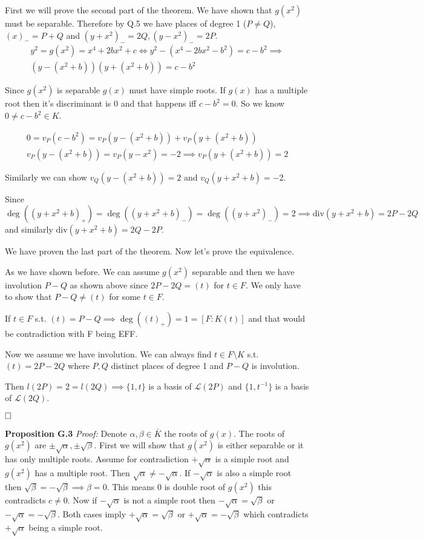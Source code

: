 \documentclass[12pt, a4paper]{article}
\newcommand{\qed}{\hfill\square}
\begin{document}
First we will prove the second part of the theorem. We have shown that $g(x^2)$ must be separable. Therefore by Q.5 we have places of degree 1 ($P\neq Q$), $(x)_{-} = P+Q$ and $(y+x^2)_{-}=2Q, (y-x^2)_{-} = 2P$.
\begin{gather*}
y^2=g(x^2) = x^4+2bx^2+c \iff y^2-(x^4-2bx^2-b^2) = c - b^2 \implies \\
(y-(x^2+b))(y+(x^2+b))=c-b^2
\end{gather*}

Since $g(x^2)$ is separable $g(x)$ must have simple roots. If $g(x)$ has a multiple root then it's discriminant is 0 and that happens iff $c-b^2=0$. So we know $0 \neq c-b^2 \in K$.

\begin{gather*}
0=v_P(c-b^2)=v_P(y-(x^2+b)) + v_P(y+(x^2+b))\\
v_P(y-(x^2+b)) = v_P(y-x^2) = -2 \implies v_P(y+(x^2+b)) = 2
\end{gather*}

Similarly we can show $v_Q(y-(x^2+b)) = 2$ and $v_Q(y+x^2+b)=-2$. 

Since $\deg((y+x^2+b)_{+}) = \deg((y+x^2+b)_{-}) = \deg((y+x^2)_{-}) = 2 \implies \text{div}(y+x^2+b) = 2P - 2Q$ and similarly $\text{div}(y+x^2+b) = 2Q - 2P$.

We have proven the last part of the theorem. Now let's prove the equivalence.

As we have shown before. We can assume $g(x^2)$ separable and then we have involution $P-Q$ as shown above since $2P-2Q = (t)$ for $t \in F$. We only have to show that $P-Q \neq (t)$ for some $t \in F$. 

If $t \in F$ s.t. $(t) = P - Q \implies \deg((t)_{+}) = 1 = [F:K(t)]$ and that would be contradiction with F being EFF.

Now we assume we have involution. We can always find $t \in F \setminus K$ s.t. $(t) = 2P-2Q$ where $P,Q$ distinct places of degree 1 and $P-Q$ is involution.

Then $l(2P) = 2 = l(2Q) \implies \{1,t\}$ is a basis of $\mathcal{L}(2P)$ and $\{1,t^{-1}\}$ is a basis of $\mathcal{L}(2Q)$.

$\qed$


\textbf{Proposition G.3} \textit{Proof:}
Denote $\alpha, \beta \in \bar{K}$ the roots of $g(x)$. The roots of $g(x^2)$ are $\pm \sqrt{\alpha}, \pm \sqrt{\beta}$. First we will show that $g(x^2)$ is either separable or it has only multiple roots. Assume for contradiction $+\sqrt{\alpha}$ is a simple root and $g(x^2)$ has a multiple root. Then $\sqrt{\alpha} \neq -\sqrt{\alpha}$. If $-\sqrt{\alpha}$ is also a simple root then $\sqrt{\beta} = -\sqrt{\beta} \implies \beta = 0$. This means $0$ is double root of $g(x^2)$ this contradicts $c \neq 0$. Now if $-\sqrt{\alpha}$ is not a simple root then $-\sqrt{\alpha}=\sqrt{\beta}$ or $-\sqrt{\alpha}=-\sqrt{\beta}$. Both cases imply $+\sqrt{\alpha} = \sqrt{\beta}$ or $+\sqrt{\alpha} =-\sqrt{\beta}$ which contradicts $+\sqrt{\alpha}$ being a simple root.
\end{document}
